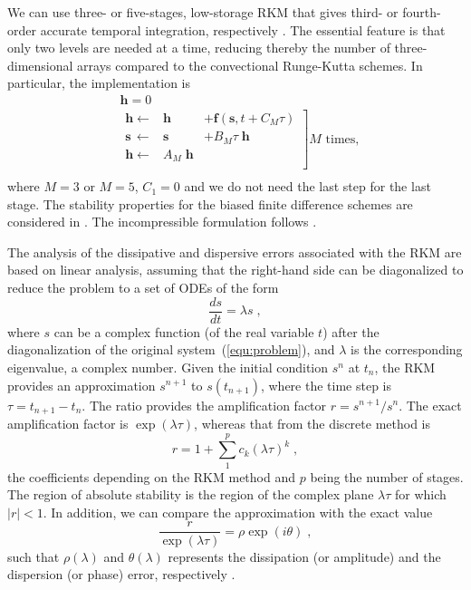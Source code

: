 {We can use three- or five-stages, low-storage RKM that gives third- or
fourth-order accurate temporal integration, respectively
\citep{Williamson:1980,Carpenter:1994}. The essential feature is that only two
levels are needed at a time, reducing thereby the number of three-dimensional
arrays compared to the convectional Runge-Kutta schemes. In particular, the
implementation is
\begin{align*}
&\mathbf{h} = 0 \\
&\left.
\begin{array}{rrl}
\mathbf{h} \leftarrow   & \mathbf{h} &+ \mathbf{f}(\mathbf{s},t+C_M\tau) \\
\mathbf{s}\, \leftarrow & \mathbf{s} &+ B_M\tau\;\mathbf{h}       \\
\mathbf{h} \leftarrow   &A_M\; \mathbf{h}& \\
\end{array}\right] M \textrm{ times},\\
\end{align*}
where $M=3$ or $M=5$, $C_1=0$ and we do not need the last step for the last
stage.  The stability properties for the biased finite difference schemes are
considered in \cite{Carpenter:1993}. The incompressible formulation follows
\cite{Wilson:1998}.

The analysis of the dissipative and dispersive errors associated with the RKM
are based on linear analysis, assuming that the right-hand side can be
diagonalized to reduce the problem to a set of ODEs of the form
\begin{equation}
\frac{ds}{dt}=\lambda s \;,
\end{equation}
where $s$ can be a complex function (of the real variable $t$) after the
diagonalization of the original system~(\ref{equ:problem}), and $\lambda$ is the
corresponding eigenvalue, a complex number. Given the initial condition $s^n$ at
$t_n$, the RKM provides an approximation $s^{n+1}$ to $s(t_{n+1})$, where the
time step is $\tau=t_{n+1}-t_n$. The ratio provides the amplification factor
$r=s^{n+1}/s^n$. The exact amplification factor is $\exp(\lambda \tau)$, whereas
that from the discrete method is
\begin{equation}
  r=1+\sum_1^pc_k(\lambda \tau)^k\;,
\end{equation}
the coefficients depending on the RKM method and $p$ being the number of
stages. The region of absolute stability is the region of the complex plane
$\lambda\tau$ for which $|r|<1$. In addition, we can compare the approximation
with the exact value
\begin{equation}
  \frac{r}{\exp(\lambda\tau)}=\rho\exp(i\theta)\;,
  \label{equ:rkmerror}
\end{equation}
such that $\rho(\lambda)$ and $\theta(\lambda)$ represents the dissipation (or
amplitude) and the dispersion (or phase) error, respectively \citep{Hu:1996}.

}
